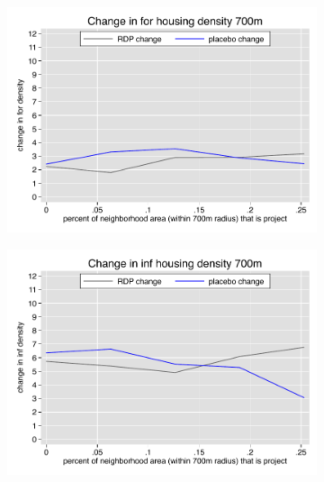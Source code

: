 \documentclass[12pt]{article}
\begin{document}
\begin{figure}
        \begin{subfigure}[b]{0.495\textwidth}
            \centering
            \includegraphics[width=\textwidth,trim={0.3cm .3cm 0.1cm 0cm}, clip=true]{figures/change_for_700_total.pdf}
        \end{subfigure}
        \hfill
        \begin{subfigure}[b]{0.495\textwidth}  
            \centering 
            \includegraphics[width=\textwidth,trim={0.3cm .3cm 0.1cm 0cm}, clip=true]{figures/change_inf_700_total.pdf}
        \end{subfigure}
        \vspace{-6mm}
  \end{figure} 
\end{document}
